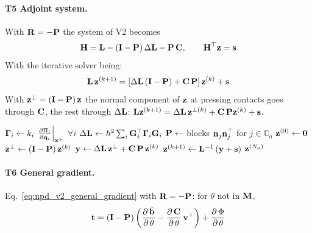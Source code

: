 \paragraph{T5 Adjoint system.}\mbox{}
\newline With $\mathbf{R} = -\mathbf{P}$ the system of V2 becomes
\begin{equation*}
    \mathbf{H} = \mathbf{L} - \left(\mathbf{I} - \mathbf{P}\right)\Delta\mathbf{L} - \mathbf{P}\,\mathbf{C},
    \qquad
    \mathbf{H}^\top\mathbf{z} = \mathbf{s}
\end{equation*}
\noindent With the iterative solver being:
\begin{equation*}   
    \mathbf{L}\,\mathbf{z}^{(k+1)} = \left[\Delta\mathbf{L}\left(\mathbf{I} - \mathbf{P}\right) + \mathbf{C}\,\mathbf{P}\right]\mathbf{z}^{(k)} + \mathbf{s}
\end{equation*}
\noindent With $\mathbf{z}^\perp = \left(\mathbf{I} - \mathbf{P}\right)\mathbf{z}$ the normal component of $\mathbf{z}$ at pressing contacts goes through $\mathbf{C}$, the rest through $\Delta\mathbf{L}$: $\mathbf{L}\mathbf{z}^{(k+1)} = \Delta\mathbf{L}\,\mathbf{z}^{\perp(k)} + \mathbf{C}\,\mathbf{P}\mathbf{z}^{(k)} + \mathbf{s}$.
\begin{algorithm}[H]
\caption{V2a: adjoint solve for one step (changes from Alg.~\ref{alg:npd_v2_adjoint}: $\Pb$).}
\label{alg:npd_v2a_adjoint}
\begin{algorithmic}[1]
    \State $\boldsymbol{\Gamma}_i \gets k_i\,\left.\frac{\partial \Pi_i}{\partial \mathbf{q}_i}\right|_{\mathbf{x}^+}$ \quad $\forall i$
    \State $\Delta\mathbf{L} \gets h^2\sum_i \mathbf{G}_i^\top\boldsymbol{\Gamma}_i\mathbf{G}_i$ 
    \State $\mathbf{P} \gets$ blocks $\mathbf{n}_j\mathbf{n}_j^\top$ for $j \in \mathbb{C}_a$ 
    \State $\mathbf{z}^{(0)} \gets \mathbf{0}$
        \State $\mathbf{z}^\perp \gets \left(\mathbf{I} - \mathbf{P}\right)\mathbf{z}^{(k)}$
        \State $\mathbf{y} \gets \Delta\mathbf{L}\,\mathbf{z}^\perp + \mathbf{C}\,\mathbf{P}\,\mathbf{z}^{(k)}$ 
        \State $\mathbf{z}^{(k+1)} \gets \mathbf{L}^{-1}\left(\mathbf{y} + \mathbf{s}\right)$ 
    \EndFor
    \State \Return $\mathbf{z}^{(N_a)}$
\EndFunction
\end{algorithmic}
\end{algorithm}

\paragraph{T6 General gradient.}\mbox{}
\newline Eq.~\eqref{eq:npd_v2_general_gradient} with $\mathbf{R} = -\mathbf{P}$: for $\theta$ not in $\mathbf{M}$,
\begin{equation*}
    \mathbf{t} = \left(\mathbf{I} - \mathbf{P}\right)\left(\dfrac{\partial\, \tilde{\mathbf{b}}}{\partial\, \theta} - \dfrac{\partial\, \mathbf{C}}{\partial\, \theta}\,\mathbf{v}^+\right) + \dfrac{\partial\, \Phi}{\partial\, \theta}
\end{equation*}

